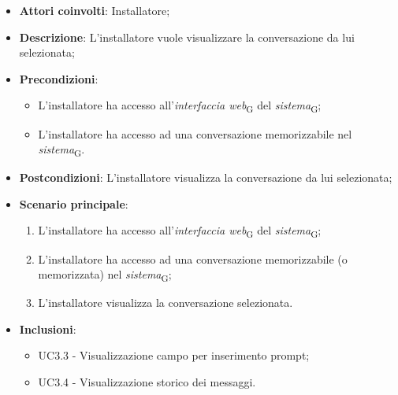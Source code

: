 \begin{itemize}
    \item \textbf{Attori coinvolti}: Installatore;
    \item \textbf{Descrizione}: L'installatore vuole visualizzare la conversazione da lui selezionata;
    \item \textbf{Precondizioni}: 
    \begin{itemize}
        \item L’installatore ha accesso all’\textit{interfaccia web}\textsubscript{G} del \textit{sistema}\textsubscript{G};
        \item L’installatore ha accesso ad una conversazione memorizzabile nel \textit{sistema}\textsubscript{G}.
    \end{itemize}
    \item \textbf{Postcondizioni}: L'installatore visualizza la conversazione da lui selezionata;
    \item \textbf{Scenario principale}:
    \begin{enumerate}
        \item L’installatore ha accesso all’\textit{interfaccia web}\textsubscript{G} del \textit{sistema}\textsubscript{G};
        \item L’installatore ha accesso ad una conversazione memorizzabile (o memorizzata) nel \textit{sistema}\textsubscript{G};
        \item L'installatore visualizza la conversazione selezionata.
    \end{enumerate}
    \item \textbf{Inclusioni}: 
    \begin{itemize}
        \item UC3.3 - Visualizzazione campo per inserimento prompt;
        \item UC3.4 - Visualizzazione storico dei messaggi.
    \end{itemize}
\end{itemize}

